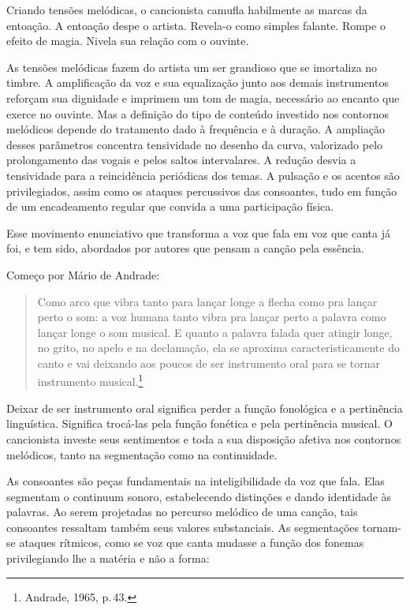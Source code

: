 Criando tensões melódicas, o cancionista camufla habilmente as marcas da
entoação. A entoação despe o artista. Revela-o como simples falante. Rompe o
efeito de magia. Nivela sua relação com o ouvinte.

As tensões melódicas fazem do artista um ser grandioso que se imortaliza
no timbre. A amplificação da voz e sua equalização junto aos demais
instrumentos reforçam sua dignidade e imprimem um tom de magia,
necessário ao encanto que exerce no ouvinte. Mas a definição do tipo de
conteúdo investido nos contornos melódicos depende do tratamento dado à
frequência e à duração. A ampliação desses parâmetros concentra
tensividade no desenho da curva, valorizado pelo prolongamento das
vogais e pelos saltos intervalares. A redução desvia a tensividade para
a reincidência periódicas dos temas. A pulsação e os acentos são
privilegiados, assim como os ataques percussivos das consoantes, tudo em
função de um encadeamento regular que convida a uma participação física.

Esse movimento enunciativo que transforma a voz que fala em voz que
canta já foi, e tem sido, abordados por autores que pensam a canção pela
essência.

Começo por Mário de Andrade:

\begin{quote}
Como arco que vibra tanto para lançar longe a flecha como pra lançar
perto o som: a voz humana tanto vibra pra lançar perto a palavra como
lançar longe o som musical. E quanto a palavra falada quer atingir
longe, no grito, no apelo e na declamação, ela se aproxima
caracteristicamente do canto e vai deixando aos poucos de ser
instrumento oral para se tornar instrumento musical.\footnote{Andrade, 1965,
p.\,43.}
\end{quote}

Deixar de ser instrumento oral significa perder a função fonológica e a
pertinência linguística. Significa trocá-las pela função fonética e pela
pertinência musical. O cancionista investe seus sentimentos e toda a sua
disposição afetiva nos contornos melódicos, tanto na segmentação como na
continuidade.

As consoantes são peças fundamentais na inteligibilidade da voz que
fala. Elas segmentam o continuum sonoro, estabelecendo distinções e
dando identidade às palavras. Ao serem projetadas no percurso melódico
de uma canção, tais consoantes ressaltam também seus valores
substanciais. As segmentações tornam-se ataques rítmicos, como se voz
que canta mudasse a função dos fonemas privilegiando lhe a matéria e não
a forma:

